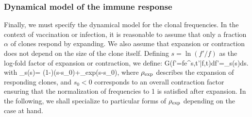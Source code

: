\subsubsection*{Dynamical model of the immune response}
Finally, we must specify the dynamical model for the clonal frequencies. In the context of vaccination or infection, it is reasonable to assume that only a fraction $\alpha$ of clones respond by expanding. We also assume that expansion or contraction does not depend on the size of the clone itself. Defining $s=\ln(f'/f)$ as the log-fold factor of expansion or contraction, we define:
\beq
G(f'=fe^s,t'|f,t)\textrm{d}f'=\rho_s(s)\textrm{d}s.
\eeq
with
\beq\label{eq:exp}
\rho_s(s)= (1-\alpha)\delta(s-s_0)+\alpha \rho_{\rm exp}(s-s_0),
\eeq
where $\rho_{\rm exp}$ describes the expansion of responding clones, and $s_0<0$ corresponds to an overall contraction factor ensuring that the normalization of frequencies to 1 is satisfied after expansion. In the following, we shall specialize to particular forms of $\rho_{\rm exp}$ depending on the case at hand.
